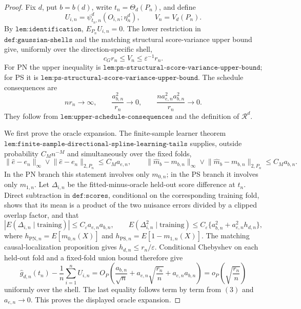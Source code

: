 \documentclass{article}
\begin{document}
\begin{proof}
Fix \(d\), put \(b=b(d)\), write \(t_n=\Theta_d(P_n)\), and define
\[U_{i,n}=\psi^d_{t_n,n}(O_{i,n};\eta_n^d),\qquad V_n=V_d(P_n).\tag{1}\]
By \(\texttt{lem:identification}\), \(E_{P_n}U_{i,n}=0\). The lower restriction in \(\texttt{def:gaussian-shells}\) and the matching structural score-variance upper bound give, uniformly over the direction-specific shell,
\[c_Gr_n\le V_n\le\varepsilon^{-1}r_n.\tag{2}\]
For PN the upper inequality is \(\texttt{lem:pn-structural-score-variance-upper-bound}\); for PS it is \(\texttt{lem:ps-structural-score-variance-upper-bound}\). The schedule consequences are
\[nr_n\longrightarrow\infty,\qquad \frac{a_{b,n}^2}{r_n}\longrightarrow0,\qquad \frac{na_{e,n}^2a_{b,n}^2}{r_n}\longrightarrow0.\tag{3}\]
They follow from \(\texttt{lem:upper-schedule-consequences}\) and the definition of \(\mathcal R^d\).

We first prove the oracle expansion. The finite-sample learner theorem \(\texttt{lem:finite-sample-directional-spline-learning-tails}\) supplies, outside probability \(C_Mn^{-M}\) and simultaneously over the fixed folds,
\[\lVert\widehat e-e_n\rVert_\infty\vee\lVert\widehat e-e_n\rVert_{2,P_n}\le C_Ma_{e,n},\qquad \lVert\widehat m_b-m_{b,n}\rVert_\infty\vee\lVert\widehat m_b-m_{b,n}\rVert_{2,P_n}\le C_Ma_{b,n}.\tag{4}\]
In the PN branch this statement involves only \(m_{0,n}\); in the PS branch it involves only \(m_{1,n}\). Let \(\Delta_{i,n}\) be the fitted-minus-oracle held-out score difference at \(t_n\). Direct subtraction in \(\texttt{def:scores}\), conditional on the corresponding training fold, shows that its mean is a product of the two nuisance errors divided by a clipped overlap factor, and that
\[|E(\Delta_{i,n}\mid\mathrm{training})|\le C_\varepsilon a_{e,n}a_{b,n},\qquad E(\Delta_{i,n}^2\mid\mathrm{training})\le C_\varepsilon\{a_{b,n}^2+a_{e,n}^2h_{d,n}\},\tag{5}\]
where \(h_{\mathrm{PN},n}=E[m_{0,n}(X)]\) and \(h_{\mathrm{PS},n}=E[1-m_{1,n}(X)]\). The matching causal-localization proposition gives \(h_{d,n}\le r_n/\varepsilon\). Conditional Chebyshev on each held-out fold and a fixed-fold union bound therefore give
\[\widehat g_{d,n}(t_n)-\frac1n\sum_{i=1}^nU_{i,n}=O_P\!\left(\frac{a_{b,n}}{\sqrt n}+a_{e,n}\sqrt{\frac{r_n}{n}}+a_{e,n}a_{b,n}\right)=o_P\!\left(\sqrt{\frac{r_n}{n}}\right)\tag{6}\]
uniformly over the shell. The last equality follows term by term from \((3)\) and \(a_{e,n}\to0\). This proves the displayed oracle expansion.


\end{proof}
\end{document}
